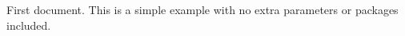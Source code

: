 \documentclass{article}
\begin{document}
	First document. This is a simple example with no extra parameters or packages included.
\end{document}
